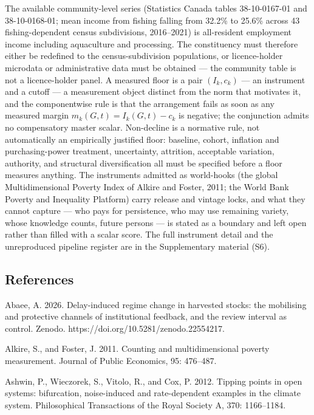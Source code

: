 \documentclass[11pt]{article}
\begin{document}
The available community-level series (Statistics Canada tables
38-10-0167-01 and 38-10-0168-01; mean income from fishing falling from
32.2\% to 25.6\% across 43 fishing-dependent census subdivisions,
2016--2021) is all-resident employment income including aquaculture and
processing. The constituency must therefore either be redefined to the
census-subdivision populations, or licence-holder microdata or
administrative data must be obtained --- the community table is not a
licence-holder panel. A measured floor is a pair \((I_k,c_k)\) --- an
instrument and a cutoff --- a measurement object distinct from the norm
that motivates it, and the componentwise rule is that the arrangement
fails as soon as any measured margin \(m_k(G,t)=I_k(G,t)-c_k\) is
negative; the conjunction admits no compensatory master scalar.
Non-decline is a normative rule, not automatically an empirically
justified floor: baseline, cohort, inflation and purchasing-power
treatment, uncertainty, attrition, acceptable variation, authority, and
structural diversification all must be specified before a floor
measures anything. The instruments admitted as world-hooks (the global
Multidimensional Poverty Index of Alkire and Foster, 2011; the World
Bank Poverty and Inequality Platform) carry release and vintage locks,
and what they cannot capture --- who pays for persistence, who may use
remaining variety, whose knowledge counts, future persons --- is stated
as a boundary and left open rather than filled with a scalar score. The
full instrument detail and the unreproduced pipeline register are in the
Supplementary material (S6).

\subsection{References}\label{references}

Abaee, A. 2026. Delay-induced regime change in harvested stocks: the
mobilising and protective channels of institutional feedback, and the
review interval as control. Zenodo.
https://doi.org/10.5281/zenodo.22554217.

Alkire, S., and Foster, J. 2011. Counting and multidimensional poverty
measurement. Journal of Public Economics, 95: 476--487.

Ashwin, P., Wieczorek, S., Vitolo, R., and Cox, P. 2012. Tipping points
in open systems: bifurcation, noise-induced and rate-dependent examples
in the climate system. Philosophical Transactions of the Royal Society
A, 370: 1166--1184.
\end{document}
